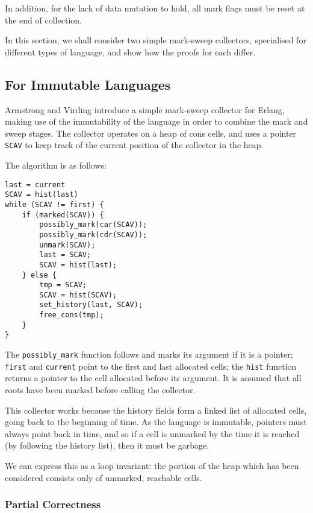In addition, for the lack of data mutation to hold, all mark flags
must be reset at the end of collection.

In this section, we shall consider two simple mark-sweep collectors,
specialised for different types of language, and show how the proofs
for each differ.

\subsection{For Immutable Languages}

Armstrong and Virding\cite{Armstrong95} introduce a simple
\gls{mark-sweep} \gls{collector} for Erlang, making use of the
immutability of the language in order to combine the mark and sweep
stages. The \gls{collector} operates on a \gls{heap} of cons cells,
and uses a \gls{pointer} \texttt{SCAV} to keep track of the current
position of the \gls{collector} in the heap.

The algorithm is as follows:

\begin{lstlisting}
last = current
SCAV = hist(last)
while (SCAV != first) {
    if (marked(SCAV)) {
        possibly_mark(car(SCAV));
        possibly_mark(cdr(SCAV));
        unmark(SCAV);
        last = SCAV;
        SCAV = hist(last);
    } else {
        tmp = SCAV;
        SCAV = hist(SCAV);
        set_history(last, SCAV);
        free_cons(tmp);
    }
}
\end{lstlisting}

The \texttt{possibly\_mark} function follows and marks its argument if
it is a pointer; \texttt{first} and \texttt{current} point to the
first and last allocated \glspl{cell}; the \texttt{hist} function
returns a \gls{pointer} to the \gls{cell} allocated before its
argument. It is assumed that all roots have been marked before calling
the collector.

This \gls{collector} works because the history fields form a linked
list of allocated cells, going back to the beginning of time. As the
language is immutable, pointers must always point back in time, and so
if a cell is unmarked by the time it is reached (by following the
history list), then it must be garbage.

We can express this as a loop invariant: the portion of the heap which
has been considered consists only of unmarked, reachable cells.

\subsubsection{Partial Correctness}

